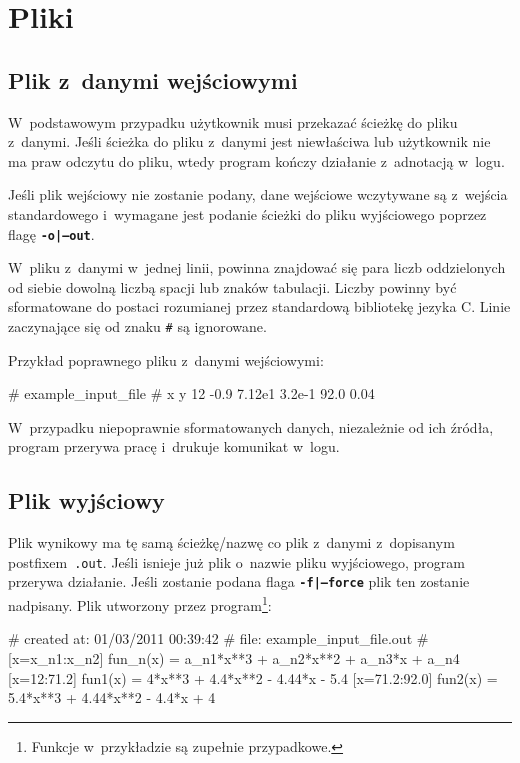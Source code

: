 \documentclass[10pt,a4paper]{article}
\newcommand{\prog}[1]{\texttt{#1}}
\newcommand{\flag}[1]{\textbf{\prog{#1}}}
\begin{document}
\section{Pliki}
\label{sec:pliki}

\subsection{Plik z~danymi wejściowymi}
\label{sec:plik_wejsciowy}

W~podstawowym przypadku użytkownik musi przekazać ścieżkę do pliku z~danymi.
Jeśli ścieżka do pliku z~danymi jest niewłaściwa lub użytkownik nie ma praw
odczytu do pliku, wtedy program kończy działanie z~adnotacją w~logu.

Jeśli plik wejściowy nie zostanie podany, dane wejściowe wczytywane są
z~wejścia standardowego i~wymagane jest podanie ścieżki do pliku wyjściowego
poprzez flagę \flag{-o|--out}.

W~pliku z~danymi w~jednej linii, powinna znajdować się para liczb oddzielonych
od siebie dowolną liczbą spacji lub znaków tabulacji. Liczby powinny być
sformatowane do postaci rozumianej przez standardową bibliotekę jezyka C.
Linie zaczynające się od znaku \prog{\#} są ignorowane.

Przykład poprawnego pliku z~danymi wejściowymi:
\vspace{-12pt}
\begin{SmallVerbatim}
    # example_input_file
    # x y
    12     -0.9
    7.12e1  3.2e-1  
    92.0    0.04
\end{SmallVerbatim}

W~przypadku niepoprawnie sformatowanych danych, niezależnie od ich źródła,
program przerywa pracę i~drukuje komunikat w~logu.

\subsection{Plik wyjściowy}
\label{sec:plik_wyjsciowy}

Plik wynikowy ma tę samą ścieżkę/nazwę co plik z~danymi z~dopisanym
postfixem~\prog{.out}. Jeśli isnieje już plik o~nazwie pliku wyjściowego,
program przerywa działanie. Jeśli zostanie podana flaga \flag{-f|--force}
plik ten zostanie nadpisany. Plik utworzony przez program\footnote{Funkcje
w~przykładzie są zupełnie przypadkowe.}:
\vspace{-12pt}
\begin{SmallVerbatim}
    # created at: 01/03/2011 00:39:42
    #       file: example_input_file.out
    # [x=x_{n1}:x_{n2}] fun_n(x) = a_{n1}*x**3 + a_{n2}*x**2 + a_{n3}*x + a_{n4}
    [x=12:71.2] fun1(x) = 4*x**3 + 4.4*x**2 - 4.44*x - 5.4
    [x=71.2:92.0] fun2(x) = 5.4*x**3 + 4.44*x**2 - 4.4*x + 4
\end{SmallVerbatim}
\end{document}
